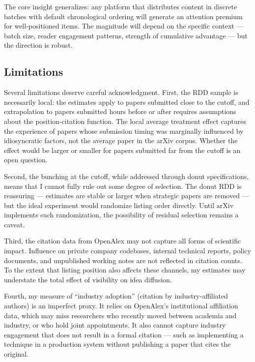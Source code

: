 \documentclass[12pt]{article}
\begin{document}
The core insight generalizes: any platform that distributes content in discrete batches with default chronological ordering will generate an attention premium for well-positioned items. The magnitude will depend on the specific context --- batch size, reader engagement patterns, strength of cumulative advantage --- but the direction is robust.

\subsection{Limitations}

Several limitations deserve careful acknowledgment. First, the RDD sample is necessarily local: the estimates apply to papers submitted close to the cutoff, and extrapolation to papers submitted hours before or after requires assumptions about the position-citation function. The local average treatment effect captures the experience of papers whose submission timing was marginally influenced by idiosyncratic factors, not the average paper in the arXiv corpus. Whether the effect would be larger or smaller for papers submitted far from the cutoff is an open question.

Second, the bunching at the cutoff, while addressed through donut specifications, means that I cannot fully rule out some degree of selection. The donut RDD is reassuring --- estimates are stable or larger when strategic papers are removed --- but the ideal experiment would randomize listing order directly. Until arXiv implements such randomization, the possibility of residual selection remains a caveat.

Third, the citation data from OpenAlex may not capture all forms of scientific impact. Influence on private company codebases, internal technical reports, policy documents, and unpublished working notes are not reflected in citation counts. To the extent that listing position also affects these channels, my estimates may understate the total effect of visibility on idea diffusion.

Fourth, my measure of ``industry adoption'' (citation by industry-affiliated authors) is an imperfect proxy. It relies on OpenAlex's institutional affiliation data, which may miss researchers who recently moved between academia and industry, or who hold joint appointments. It also cannot capture industry engagement that does not result in a formal citation --- such as implementing a technique in a production system without publishing a paper that cites the original.
\end{document}
